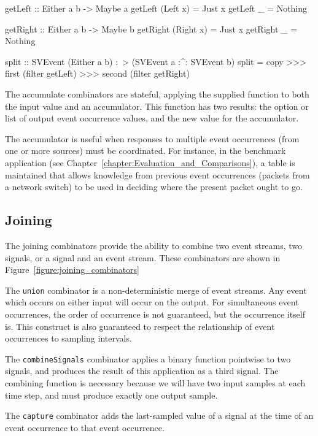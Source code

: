\begin{code}
getLeft :: Either a b -> Maybe a
getLeft (Left x) = Just x
getLeft _ = Nothing

getRight :: Either a b -> Maybe b
getRight (Right x) = Just x
getRight _ = Nothing

split :: SVEvent (Either a b) :~> (SVEvent a :^: SVEvent b)
split = copy >>> first (filter getLeft) >>> second (filter getRight)
\end{code}

The accumulate combinators are stateful, applying the supplied function
to both the input value and an accumulator. This function has two results:
the option or list of output event occurrence values, and the new value
for the accumulator.

The accumulator is useful when responses to multiple event occurrences
(from one or more sources) must be coordinated. For instance, in the
benchmark application (see Chapter~\ref{chapter:Evaluation_and_Comparisons}),
a table is maintained that allows knowledge from previous event occurrences
(packets from a network switch) to be used in deciding where the present
packet ought to go.

\subsection{Joining}
\label{subsection:System_Design_and_Interface-Combinators-Joining}

The joining combinators provide the ability to combine two event
streams, two signals, or a signal and an event stream. These
combinators are shown in Figure~\ref{figure:joining_combinators}

The {\tt union} combinator is a non-deterministic merge of event
streams. Any event which occurs on either input will occur
on the output. For simultaneous event occurrences, the order of occurrence
is not guaranteed, but the occurrence itself is. This construct
is also guaranteed to respect the relationship of event occurrences to sampling
intervals.

The {\tt combineSignals} combinator applies a binary function pointwise to two
signals, and produces the result of this application as a third signal. The
combining function is necessary because we will have two input samples at each
time step, and must produce exactly one output sample.

The {\tt capture} combinator adds the last-sampled value of a signal at the time
of an event occurrence to that event occurrence.

